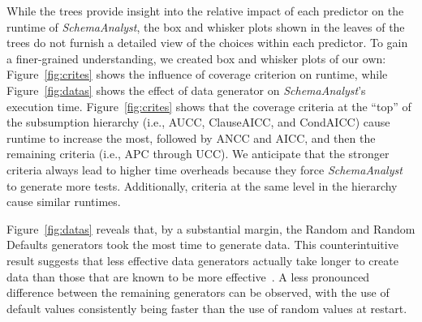
While the trees provide insight into the relative impact of each predictor on the runtime of \textit{SchemaAnalyst}, the
box and whisker plots shown in the leaves of the trees do not furnish a detailed view of the choices within each
predictor.  To gain a finer-grained understanding, we created box and whisker plots of our own:  Figure~\ref{fig:crites}
shows the influence of coverage criterion on runtime, while Figure~\ref{fig:datas} shows the effect of data generator on
{\em SchemaAnalyst}'s execution time.  Figure~\ref{fig:crites} shows that the coverage criteria at the ``top'' of the
subsumption hierarchy (i.e., AUCC, ClauseAICC, and CondAICC) cause runtime to increase the most, followed by ANCC and
AICC, and then the remaining criteria (i.e., APC through UCC).  We anticipate that the stronger criteria always lead to
higher time overheads because they force {\em SchemaAnalyst} to generate more tests. Additionally, criteria at the same
level in the hierarchy cause similar runtimes.

Figure~\ref{fig:datas} reveals that, by a substantial margin, the Random and Random Defaults generators took the most
time to generate data. This counterintuitive result suggests that less effective data generators actually take longer to
create data than those that are known to be more effective~\cite{kapfhammer2013}.  A less pronounced difference between
the remaining generators can be observed, with the use of default values consistently being faster than the use of
random values at restart.

